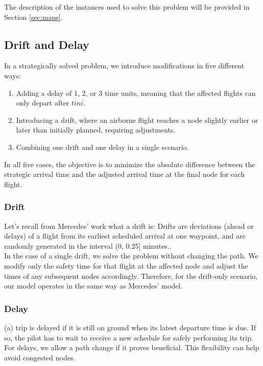 \documentclass[../thesis.tex]{subfiles}
\begin{document}
The description of the instances used to solve this problem will be provided in Section \ref{sec:maps}.

\subsection{Drift and Delay}  

In a strategically solved problem, we introduce modifications in five different ways:  
\begin{enumerate}
    \item Adding a delay of 1, 2, or 3 time units, meaning that the affected flights can only depart after $tini$.  
    \item Introducing a drift, where an airborne flight reaches a node slightly earlier or later than initially planned, requiring adjustments.  
    \item Combining one drift and one delay in a single scenario.  
\end{enumerate}  

In all five cases, the objective is to minimize the absolute difference between the strategic arrival time and the adjusted arrival time at the final node for each flight.

\subsubsection{Drift}
Let's recall from Mercedes' work what a drift is:  
\ll Drifts are deviations (ahead or delays) of a flight from its earliest scheduled arrival at one waypoint, and are randomly generated in the interval (0, 0.25] minutes..\\
In the case of a single drift, we solve the problem without changing the path. We modify only the safety time for that flight at the affected node and adjust the times of any subsequent nodes accordingly. Therefore, for the drift-only scenario, our model operates in the same way as Mercedes' model.
\subsubsection{Delay}
\ll[\dots] (a) trip is delayed if it is still on ground when its latest departure time is due. If so, the pilot has to wait to receive a new schedule for safely performing its trip.\\
For delays, we allow a path change if it proves beneficial.  
This flexibility can help avoid congested nodes.
\end{document}
